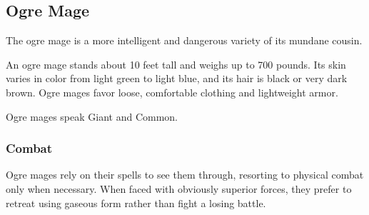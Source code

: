 \subsection{Ogre Mage}
\label{sec:OgreMage}
The ogre mage is a more intelligent and dangerous variety of its mundane cousin.

An ogre mage stands about 10 feet tall and weighs up to 700 pounds. Its skin varies in color from light green to light blue, and its hair is black or very dark brown. Ogre mages favor loose, comfortable clothing and lightweight armor.

Ogre mages speak Giant and Common.
\subsubsection{Combat}
Ogre mages rely on their spells to see them through, resorting to physical combat only when necessary.
When faced with obviously superior forces, they prefer to retreat using gaseous form rather than fight a losing battle.
